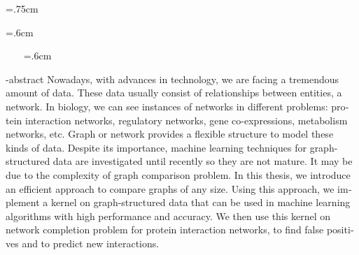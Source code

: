 {\small
{\baselineskip=.75cm

\clearpage{\pagestyle{empty}\cleardoublepage}
}
\clearpage{\pagestyle{empty}\cleardoublepage}
{\baselineskip=.6cm
{}
\printindex}
\clearpage{\pagestyle{empty}\cleardoublepage}


\clearpage{\pagestyle{empty}\cleardoublepage}
}
\newpage
\thispagestyle{empty}
\clearpage
~~~
\baselineskip=.6cm
\begin{latin}
\en-abstract{\noindent
Nowadays, with advances in technology, we are facing a tremendous amount of data. These data usually consist of relationships between entities, a network. In biology, we can see instances of networks in different problems: protein interaction networks, regulatory networks, gene co-expressions, metabolism networks, etc. Graph or network provides a flexible structure to model these kinds of data. Despite its importance, machine learning techniques for graph-structured data are investigated until recently so they are not mature. It may be due to the complexity of graph comparison problem. In this thesis, we introduce an efficient approach to compare graphs of any size. Using this approach, we implement a kernel on graph-structured data that can be used in machine learning algorithms with high performance and accuracy. We then use this kernel on network completion problem for protein interaction networks, to find false positives and to predict new interactions.
}
\latinvtitle
\end{latin}
\label{LastPage}
